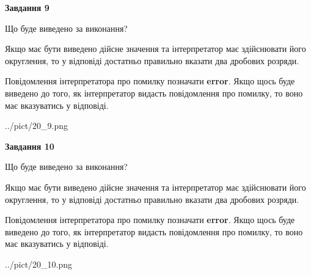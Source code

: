\documentclass[12pt, ukrainian]{article}
\begin{document}
{\begin {Large}
{\begin {center}\textbf{Завдання 9}\end {center}}\par
Що буде виведено за виконання? \par

Якщо має бути виведено дійсне значення та інтерпретатор має здійснювати його округлення, 
то у відповіді достатньо правильно вказати два дробових розряди.

Повідомлення інтерпретатора про помилку позначати \textbf{error}.
Якщо щось буде виведено до того, як інтерпретатор видасть повідомлення про помилку, 
то воно має вказуватись у відповіді. \par

\begin{center}
	{../pict/20_9.png}
\end{center}
\newpage

{\begin {center}\textbf{Завдання 10}\end {center}}\par
Що буде виведено за виконання? \par

Якщо має бути виведено дійсне значення та інтерпретатор має здійснювати його округлення, 
то у відповіді достатньо правильно вказати два дробових розряди.

Повідомлення інтерпретатора про помилку позначати \textbf{error}.
Якщо щось буде виведено до того, як інтерпретатор видасть повідомлення про помилку, 
то воно має вказуватись у відповіді. \par

\begin{center}
	{../pict/20_10.png}
\end{center}
\newpage

\end {Large}}
\end{document}
